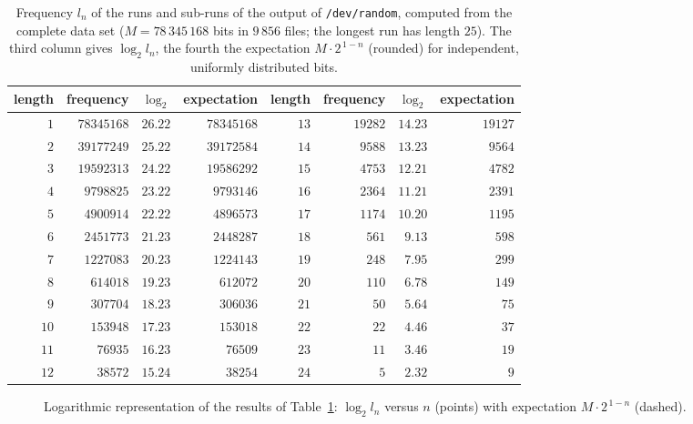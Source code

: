 \documentclass[11pt,a4paper]{scrartcl}
\theoremstyle{plain}
\theoremstyle{definition}
\theoremstyle{remark}
\begin{document}
\begin{table}[htbp]
\centering
\begin{tabular}{rrrrrrrr}
\toprule
length & frequency & $\log_2$ & expectation & length & frequency & $\log_2$ & expectation\\
\midrule
$1$&$78345168$&$26.22$&$78345168$&$13$&$19282$&$14.23$&$19127$\\
$2$&$39177249$&$25.22$&$39172584$&$14$&$9588$&$13.23$&$9564$\\
$3$&$19592313$&$24.22$&$19586292$&$15$&$4753$&$12.21$&$4782$\\
$4$&$9798825$&$23.22$&$9793146$&$16$&$2364$&$11.21$&$2391$\\
$5$&$4900914$&$22.22$&$4896573$&$17$&$1174$&$10.20$&$1195$\\
$6$&$2451773$&$21.23$&$2448287$&$18$&$561$&$9.13$&$598$\\
$7$&$1227083$&$20.23$&$1224143$&$19$&$248$&$7.95$&$299$\\
$8$&$614018$&$19.23$&$612072$&$20$&$110$&$6.78$&$149$\\
$9$&$307704$&$18.23$&$306036$&$21$&$50$&$5.64$&$75$\\
$10$&$153948$&$17.23$&$153018$&$22$&$22$&$4.46$&$37$\\
$11$&$76935$&$16.23$&$76509$&$23$&$11$&$3.46$&$19$\\
$12$&$38572$&$15.24$&$38254$&$24$&$5$&$2.32$&$9$\\
\bottomrule
\end{tabular}
\caption{Frequency $l_n$ of the runs and sub-runs of the output of
\texttt{/dev/random}, computed from the complete data set
($M=78\,345\,168$ bits in $9\,856$ files; the longest run has length
$25$). The third column gives $\log_2 l_n$, the fourth the expectation
$M\cdot 2^{\,1-n}$ (rounded) for independent, uniformly distributed
bits.}
\label{tab:haeufigkeiten}
\end{table}

\begin{figure}[htbp]
\centering
{}
\caption{Logarithmic representation of the results of
Table~\ref{tab:haeufigkeiten}: $\log_2 l_n$ versus $n$ (points) with
expectation $M\cdot 2^{\,1-n}$ (dashed).}
\label{fig:haeufigkeiten}
\end{figure}
\end{document}
